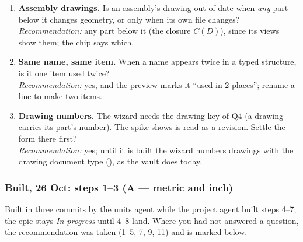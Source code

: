 \begin{enumerate}
  \item \textbf{Assembly drawings.} Is an assembly's drawing out of date when \emph{any} part below it changes geometry,
        or only when its own file changes?\\
        \emph{Recommendation:} any part below it (the closure $C(D)$), since its views show them; the chip says which.
  \item \textbf{Same name, same item.} When a name appears twice in a typed structure, is it one item used twice?\\
        \emph{Recommendation:} yes, and the preview marks it ``used in 2 places''; rename a line to make two items.
  \item \textbf{Drawing numbers.} The wizard needs the drawing key of  Q4 (a drawing carries its part's
        number). The spike shows  is read as a revision. Settle the form there first?\\
        \emph{Recommendation:} yes; until it is built the wizard numbers drawings with the drawing document type
        (), as the vault does today.
\end{enumerate}

\subsubsection*{Built, 26 Oct: steps 1--3 (A --- metric and inch)}

Built in three commits by the units agent while the project agent built steps 4--7; the epic stays
\emph{In progress} until 4--8 land. Where you had not answered a question, the recommendation was taken (1--5,
7, 9, 11) and is marked below.

